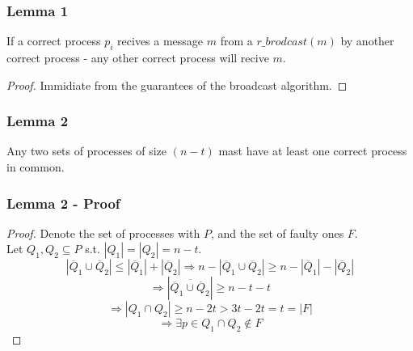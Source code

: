 \begin{frame}
    \frametitle{Lemma 1}
    \begin{lemma}
        If a correct process $p_i$ recives a message $m$ from a $r\_brodcast(m)$ by another correct process - 
        any other correct process will recive $m$.\\
    \end{lemma}

    \begin{proof}
        Immidiate from the guarantees of the broadcast algorithm.
    \end{proof}

\end{frame}
\begin{frame}
    \frametitle{Lemma 2}
    \begin{lemma}
        Any two sets of processes of size $(n-t)$ mast have
        at least one correct process in common.
    \end{lemma}
\end{frame}
\begin{frame}
    \frametitle{Lemma 2 - Proof}
    \begin{proof}
        Denote the set of processes with $P$, and the set of faulty ones $F$.\\
        Let $Q_1,Q_2\subseteq P$ s.t. $|Q_1|=|Q_2|=n-t$.\\
        \[
            |\overline{Q}_1\cup\overline{Q}_2|\leq |\overline{Q}_1|+|\overline{Q}_2|
            \Rightarrow n-|\overline{Q}_1\cup\overline{Q}_2|\geq n-|\overline{Q}_1|-|\overline{Q}_2|
        \]\[
            \Rightarrow |\overline{\overline{Q}_1\cup\overline{Q}_2}|\geq n-t-t
        \]\[
            \Rightarrow |Q_1\cap Q_2|\geq n-2t>3t-2t=t=|F|
        \]\[
            \Rightarrow \exists p\in Q_1\cap Q_2\notin F
        \]
    \end{proof}
\end{frame}

